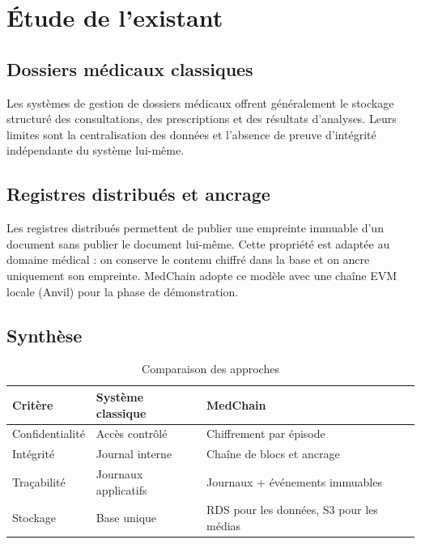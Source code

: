\section{Étude de l'existant}

\subsection{Dossiers médicaux classiques}

Les systèmes de gestion de dossiers médicaux offrent généralement le stockage structuré des consultations, des prescriptions et des résultats d'analyses. Leurs limites sont la centralisation des données et l'absence de preuve d'intégrité indépendante du système lui-même.
\newline 
\newline 
\newline 


\subsection{Registres distribués et ancrage}

Les registres distribués permettent de publier une empreinte immuable d'un document sans publier le document lui-même. Cette propriété est adaptée au domaine médical : on conserve le contenu chiffré dans la base et on ancre uniquement son empreinte. MedChain adopte ce modèle avec une chaîne EVM locale (Anvil) pour la phase de démonstration.

\subsection{Synthèse}

\begin{table}[H]
\centering
\renewcommand{\arraystretch}{1.3}
\begin{tabular}{|l|p{4cm}|p{4cm}|}
\hline
\textbf{Critère} & \textbf{Système classique} & \textbf{MedChain} \\
\hline
Confidentialité & Accès contrôlé & Chiffrement par épisode \\
\hline
Intégrité & Journal interne & Chaîne de blocs et ancrage \\
\hline
Traçabilité & Journaux applicatifs & Journaux + événements immuables \\
\hline
Stockage & Base unique & RDS pour les données, S3 pour les médias \\
\hline
\end{tabular}
\caption{Comparaison des approches}
\end{table}

